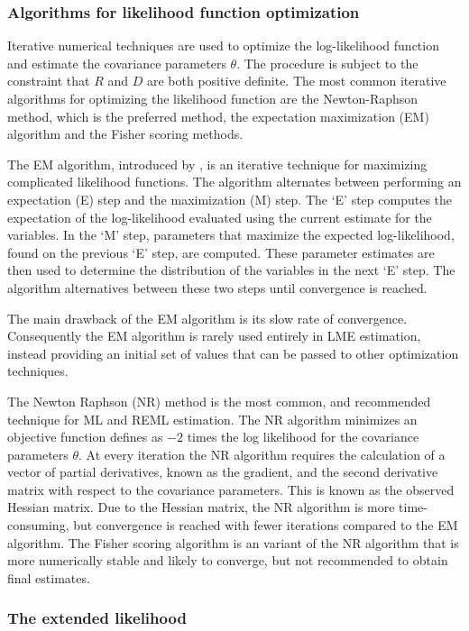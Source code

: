 \documentclass[12pt, a4paper]{report}
\theoremstyle{plain}
\theoremstyle{definition}
\theoremstyle{remark}
\begin{document}
\subsubsection{Algorithms for likelihood function optimization}Iterative numerical techniques are used to optimize the log-likelihood function and estimate the covariance parameters $\theta$. The procedure is subject to the constraint that $R$ and $D$ are both positive definite. The most common iterative algorithms for optimizing the likelihood function are the Newton-Raphson method, which is the preferred method, the expectation maximization (EM) algorithm and the Fisher scoring methods.

The EM algorithm, introduced by \citet{EM}, is an iterative technique for maximizing complicated likelihood functions. The algorithm alternates between performing an expectation (E) step
and the maximization (M) step. The `E' step computes the expectation of the log-likelihood evaluated using the current
estimate for the variables. In the `M' step, parameters that maximize the expected log-likelihood, found on the previous `E' step, are computed. These parameter estimates are then used to determine the distribution of the variables in the next `E' step. The algorithm alternatives between these two steps until convergence is reached.

The main drawback of the EM algorithm is its slow rate of
convergence. Consequently the EM algorithm is rarely used entirely in LME estimation,
instead providing an initial set of values that can be passed to
other optimization techniques.

The Newton Raphson (NR) method is the most common, and recommended technique for ML and
REML estimation. The NR algorithm minimizes an objective function defines as $-2$ times the log likelihood for the covariance parameters $\theta$. At every iteration the NR algorithm requires the
calculation of a vector of partial derivatives, known as the gradient, and the second derivative matrix with respect to the covariance parameters. This is known as the observed Hessian matrix. Due to the Hessian matrix, the NR algorithm is more time-consuming, but convergence is reached with fewer iterations compared to the EM algorithm. The Fisher scoring algorithm is an variant of the NR algorithm that is more numerically stable and likely to converge, but not recommended to obtain final estimates.

\subsubsection{The extended likelihood}
\end{document}
